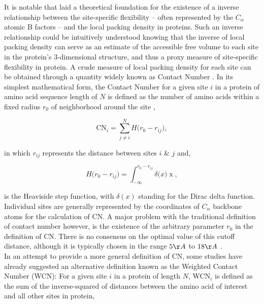 \documentclass[11pt]{article}
\begin{document}
    It is notable that \citet{halle_flexibility_2002} laid a theoretical foundation for the existence of a inverse relationship between the site-specific flexibility -- often represented by the $C_\alpha$ atomic B factors -- and the local packing density in proteins. Such an inverse relationship could be intuitively understood knowing that the inverse of local packing density can serve as an estimate of the accessible free volume to each site in the protein's 3-dimensional structure, and thus a proxy measure of site-specific flexibility in protein. A crude measure of local packing density for each site can be obtained through a quantity widely known as Contact Number \citep[e.g.,][]{liao_protein_2005}. In its simplest mathematical form, the Contact Number for a given site $i$ in a protein of amino acid sequence length of $N$ is defined as the number of amino acids within a fixed radius $r_0$ of neighborhood around the site \citep[e.g.,][]{franzosa_structural_2009},

    \begin{equation}
        \label{eqn:cn}
        \text{CN}_{i} = \sum^N_{j\neq i} H\big(r_0-r_{ij}\big),
    \end{equation}

    \noindent in which $r_{ij}$ represents the distance between sites $i$ \& $j$ and,

    \begin{equation}
        \label{eqn:heaviside}
        H\big(r_0-r_{ij}\big) = \int^{r_0-r_{ij}}_{-\infty}\delta\big(x)\operatorname{x},
    \end{equation}

    \noindent is the Heaviside step function, with $\delta(x)$ standing for the Dirac delta function. Individual sites are generally represented by the coordinates of $C_\alpha$ backbone atoms for the calculation of CN. A major problem with the traditional definition of contact number however, is the existence of the arbitrary parameter $r_0$ in the definition of CN. There is no consensus on the optimal value of this cutoff distance, although it is typically chosen in the range $5\AA$ to $18\AA$ \citep[e.g.,][]{lin_deriving_2008, franzosa_structural_2009, weng_molecular_2014}. \\

    In an attempt to provide a more general definition of CN, some studies \citep[e.g.,][]{lin_deriving_2008} have already suggested an alternative definition known as the Weighted Contact Number (WCN): For a given site $i$ in a protein of length $N$, WCN$_i$ is defined as the sum of the inverse-squared of distances between the amino acid of interest and all other sites in protein,
\end{document}
